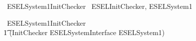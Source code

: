 \begin{zsection}
	\SECTION\ ESELSystem1InitChecker \parents\ ESELInitChecker, ESELSystem1
\end{zsection}

\begin{circus}
    \circprocess\ ESELSystem1InitChecker \circdef \\
        \t1 (InitChecker \lpar ESELSystemInterface \rpar ESELSystem1) \\
\end{circus}
